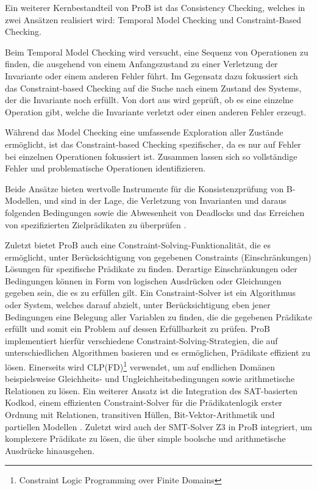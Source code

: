 Ein weiterer Kernbestandteil von ProB ist das Consistency Checking, welches in zwei Ansätzen realisiert wird: Temporal Model Checking und Constraint-Based Checking.

Beim Temporal Model Checking wird versucht, eine Sequenz von Operationen zu finden, die ausgehend von einem Anfangszustand
zu einer Verletzung der Invariante oder einem anderen Fehler führt.
Im Gegensatz dazu fokussiert sich das Constraint-based Checking auf die Suche nach einem Zustand des Systems,
der die Invariante noch erfüllt. Von dort aus wird geprüft, ob es eine einzelne Operation gibt,
welche die Invariante verletzt oder einen anderen Fehler erzeugt.

Während das Model Checking eine umfassende Exploration aller Zustände ermöglicht, ist das Constraint-based Checking spezifischer,
da es nur auf Fehler bei einzelnen Operationen fokussiert ist.
Zusammen lassen sich so vollständige Fehler und problematische Operationen identifizieren.

Beide Ansätze bieten wertvolle Instrumente für die Konsistenzprüfung von B-Modellen, und sind in der Lage, die Verletzung von Invarianten und daraus folgenden Bedingungen sowie
die Abwesenheit von Deadlocks und das Erreichen von spezifizierten Zielprädikaten zu überprüfen \cite{leuschel2008prob}.

Zuletzt bietet ProB auch eine Constraint-Solving-Funktionalität, die es ermöglicht, unter Berücksichtigung von gegebenen Constraints (Einschränkungen) Lösungen für spezifische Prädikate zu finden.
Derartige Einschränkungen oder Bedingungen können in Form von logischen Ausdrücken oder Gleichungen gegeben sein, die es zu erfüllen gilt.
Ein Constraint-Solver ist ein Algorithmus oder System, welches darauf abzielt, unter Berücksichtigung eben jener Bedingungen eine Belegung aller Variablen zu finden, die die gegebenen Prädikate erfüllt
und somit ein Problem auf dessen Erfüllbarkeit zu prüfen.
ProB implementiert hierfür verschiedene Constraint-Solving-Strategien, die auf unterschiedlichen Algorithmen basieren und es ermöglichen, Prädikate effizient zu lösen.
Einerseits wird CLP(FD)\footnote{Constraint Logic Programming over Finite Domains} verwendet, um auf endlichen Domänen beispielsweise Gleichheits- und Ungleichheitsbedingungen sowie arithmetische Relationen zu lösen.
Ein weiterer Ansatz ist die Integration des SAT-basierten Kodkod,
einem effizienten Constraint-Solver für die Prädikatenlogik erster Ordnung mit Relationen, transitiven Hüllen, Bit-Vektor-Arithmetik und partiellen Modellen \cite{torlak2007kodkod}.
Zuletzt wird auch der SMT-Solver Z3 in ProB integriert, um komplexere Prädikate zu lösen, die über simple boolsche und arithmetische Ausdrücke hinausgehen.

